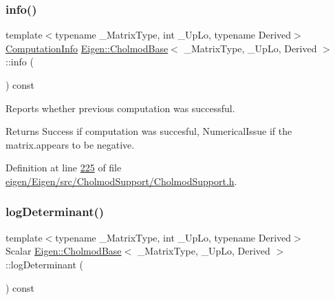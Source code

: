 \subsubsection{\texorpdfstring{info()}{info()}\hspace{0.1cm}{\footnotesize\ttfamily [2/2]}}
{\footnotesize\ttfamily template$<$typename \+\_\+\+Matrix\+Type, int \+\_\+\+Up\+Lo, typename Derived$>$ \\
\hyperlink{group__enums_ga85fad7b87587764e5cf6b513a9e0ee5e}{Computation\+Info} \hyperlink{class_eigen_1_1_cholmod_base}{Eigen\+::\+Cholmod\+Base}$<$ \+\_\+\+Matrix\+Type, \+\_\+\+Up\+Lo, Derived $>$\+::info (\begin{DoxyParamCaption}{ }\end{DoxyParamCaption}) const\hspace{0.3cm}{\ttfamily [inline]}}



Reports whether previous computation was successful. 

\begin{DoxyReturn}{Returns}
{\ttfamily Success} if computation was succesful, {\ttfamily Numerical\+Issue} if the matrix.\+appears to be negative. 
\end{DoxyReturn}


Definition at line \hyperlink{eigen_2_eigen_2src_2_cholmod_support_2_cholmod_support_8h_source_l00225}{225} of file \hyperlink{eigen_2_eigen_2src_2_cholmod_support_2_cholmod_support_8h_source}{eigen/\+Eigen/src/\+Cholmod\+Support/\+Cholmod\+Support.\+h}.

\mbox{\label{class_eigen_1_1_cholmod_base_a597f7839a39604af18a8741a0d8c46bf}} 
\subsubsection{\texorpdfstring{log\+Determinant()}{logDeterminant()}\hspace{0.1cm}{\footnotesize\ttfamily [1/2]}}
{\footnotesize\ttfamily template$<$typename \+\_\+\+Matrix\+Type, int \+\_\+\+Up\+Lo, typename Derived$>$ \\
Scalar \hyperlink{class_eigen_1_1_cholmod_base}{Eigen\+::\+Cholmod\+Base}$<$ \+\_\+\+Matrix\+Type, \+\_\+\+Up\+Lo, Derived $>$\+::log\+Determinant (\begin{DoxyParamCaption}{ }\end{DoxyParamCaption}) const\hspace{0.3cm}{\ttfamily [inline]}}

